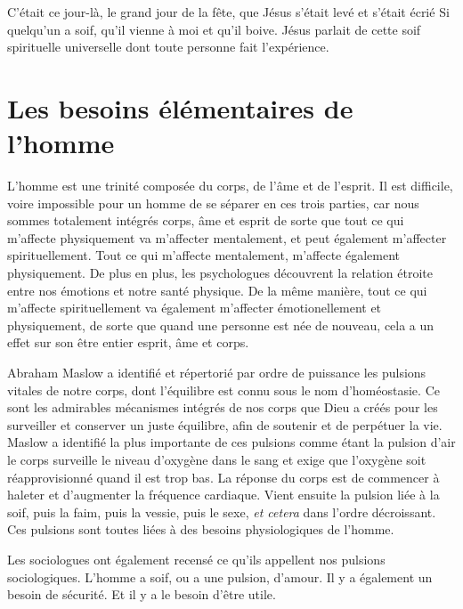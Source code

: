 C'était ce jour-là, le grand jour de la fête, que Jésus s'était levé
 et s'était écrié\frcolon{}
 \Og Si quelqu'un a soif, qu'il vienne à moi et qu'il boive. \Fg{}
 Jésus parlait de cette soif spirituelle universelle dont toute personne fait l'expérience.


\section{Les besoins \'el\'ementaires de l'homme}


L'homme est une trinité composée du corps, de l'âme et de l'esprit.
 Il est difficile, voire impossible pour un homme de se séparer
 en ces trois parties, car nous sommes totalement intégrés
 \ocadr corps, âme et esprit \fcadr{} de sorte
 que tout ce qui m'affecte
 physiquement va m'affecter mentalement, et peut également m'affecter
 spirituellement. Tout ce qui m'affecte mentalement, m'affecte
 également physiquement.
 De plus en plus, les psychologues découvrent la relation étroite
 entre nos émotions et notre santé physique.
 De la même manière, tout ce qui m'affecte spirituellement
 va également m'affecter émotionellement et physiquement,
 de sorte que quand une personne est née de nouveau,
 cela a un effet sur son être entier\frcolon{} esprit, âme et corps.

Abraham Maslow a identifié et répertorié par ordre de puissance
 les pulsions vitales de notre corps, dont l'équilibre est connu sous le nom d'homéo\-stasie.
 Ce sont les admirables mécanismes intégrés de nos corps que Dieu
 a créés pour les surveiller et conserver un juste équilibre,
 afin de soutenir et de perpétuer la vie.
 Maslow a identifié la plus importante de ces pulsions comme étant
 la pulsion d'air\frcolon{} le corps surveille le niveau d'oxygène dans le sang
 et exige que l'oxygène soit réapprovisionné quand il est trop bas.
 La réponse du corps est de commencer à haleter et d'augmenter la fréquence cardiaque.
 Vient ensuite la pulsion liée à la soif, puis la faim, puis la vessie,
 puis le sexe, \emph{et cetera} dans l'ordre décroissant.
 Ces pulsions sont toutes liées à des besoins physiologiques de l'homme.

Les sociologues ont également recensé ce qu'ils appellent nos pulsions
 sociologiques. L'homme a soif, ou a une pulsion, d'amour.
 Il y a également un besoin de sécurité. Et il y a le besoin d'être utile.


